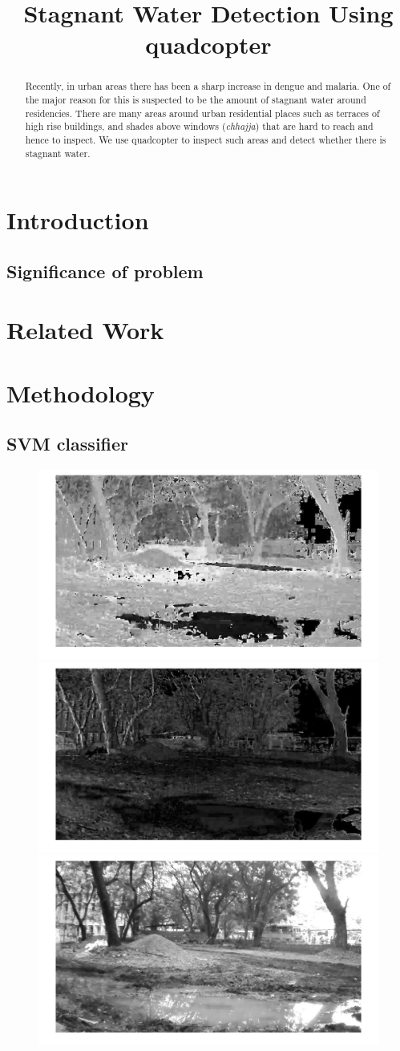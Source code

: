 \documentclass[times,10pt,twocolumn,a4paper]{article}
\title{Stagnant Water Detection Using quadcopter}
\author{}
\begin{document}
\maketitle

\begin{abstract}
Recently, in urban areas there has been a sharp increase in dengue and malaria.
One of the major reason for this is suspected to be the amount of stagnant
water around residencies. There are many areas around urban residential places
such as terraces of high rise buildings, and shades above windows
(\emph{chhajja}) that are hard to reach and hence to inspect. We use quadcopter
to inspect such areas and detect whether there is stagnant water.

\end{abstract}

\section{Introduction}

\subsection{Significance of problem}
\cite{WHO15Malaria} \cite{Cecilia14} \cite{WHO15Dengue} \cite{Microsoft15}

\section{Related Work}

\cite{rankin11}\cite{santana12}\cite{zhang10}

\section{Methodology}

\subsection{SVM classifier}

\begin{figure}[h!]
\centering
\includegraphics[width=0.3\linewidth]{images/IMG_PAIR_1_1_H.jpg}
\includegraphics[width=0.3\linewidth]{images/IMG_PAIR_1_1_S.jpg}
\includegraphics[width=0.3\linewidth]{images/IMG_PAIR_1_1_V.jpg}
\end{figure}
\end{document}
